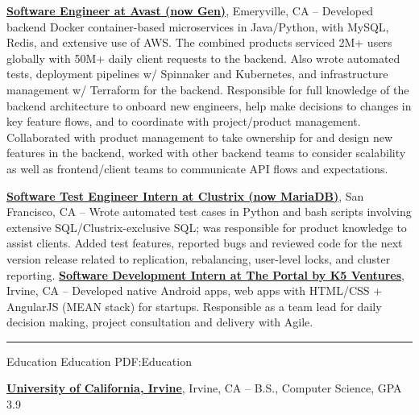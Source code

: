 \documentclass[letterpaper,MMMyyyy,nonstopmode]{simpleresumecv}
\begin{document}
\begin{Body}
\Entry
\href{https://www.locationlabs.com/}
{\textbf{Software Engineer at Avast (now Gen)}},
Emeryville, CA
\hfill
{} --
\Gap
\BulletItem Developed backend Docker container-based microservices in Java/Python, with MySQL, Redis, and extensive use of AWS. The combined products serviced 2M+ users globally with 50M+ daily client requests to the backend.
\BulletItem Also wrote automated tests, deployment pipelines w/ Spinnaker and Kubernetes, and infrastructure management w/ Terraform for the backend.
\BulletItem Responsible for full knowledge of the backend architecture to onboard new engineers, help make decisions to changes in key feature flows, and to coordinate with project/product management.
\BulletItem Collaborated with product management to take ownership for and design new features in the backend, worked with other backend teams to consider scalability as well as frontend/client teams to communicate API flows and expectations.
\newline

\Entry
\href{http://www.clustrix.com/}
{\textbf{Software Test Engineer Intern at Clustrix (now MariaDB)}},
San Francisco, CA
\hfill
{} --
\Gap
\BulletItem Wrote automated test cases in Python and bash scripts involving extensive SQL/Clustrix-exclusive SQL; was responsible for product knowledge to assist clients.
\BulletItem Added test features, reported bugs and reviewed code for the next version release related to replication, rebalancing, user-level locks, and cluster reporting.
\newline
\Entry
\href{http://www.theportal.io/}
{\textbf{Software Development Intern at The Portal by K5 Ventures}},
Irvine, CA
\hfill
{} --
\Gap
\BulletItem Developed native Android apps, web apps with HTML/CSS + AngularJS (MEAN stack) for startups.
\BulletItem Responsible as a team lead for daily decision making, project consultation and delivery with Agile.\newline
\hrule


\Section
{Education}
{Education}
{PDF:Education}

\Entry
\href{https://uci.edu/}
{\textbf{University of California, Irvine}},
Irvine, CA
\hfill
{} --
\Gap
B.S., Computer Science, GPA 3.9\newline


\end{Body}
\end{document}
